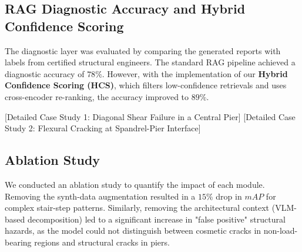 \subsection{RAG Diagnostic Accuracy and Hybrid Confidence Scoring}
\begin{sloppypar}
The diagnostic layer was evaluated by comparing the generated reports with labels from certified structural engineers. The standard RAG pipeline achieved a diagnostic accuracy of $78\%$. However, with the implementation of our \textbf{Hybrid Confidence Scoring (HCS)}, which filters low-confidence retrievals and uses cross-encoder re-ranking, the accuracy improved to $89\%$.
\end{sloppypar}

\begin{sloppypar}
[Detailed Case Study 1: Diagonal Shear Failure in a Central Pier]
[Detailed Case Study 2: Flexural Cracking at Spandrel-Pier Interface]
\end{sloppypar}

\subsection{Ablation Study}
\begin{sloppypar}
We conducted an ablation study to quantify the impact of each module. Removing the synth-data augmentation resulted in a $15\%$ drop in $mAP$ for complex stair-step patterns. Similarly, removing the architectural context (VLM-based decomposition) led to a significant increase in "false positive" structural hazards, as the model could not distinguish between cosmetic cracks in non-load-bearing regions and structural cracks in piers.
\end{sloppypar}
